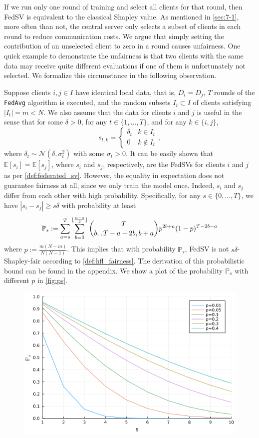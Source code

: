 If we run only one round of training and select all clients for that round, then FedSV is equivalent to the classical Shapley value.  As mentioned in \autoref{sec:7-1}, more often than not, the central server only selects a subset of clients in each round to reduce communication costs. We argue that simply setting the contribution of an unselected client to zero in a round causes unfairness. One quick example to demonstrate the unfairness is that two clients with the same data may receive quite different evaluations if one of them is unfortunately not selected. We formalize this circumstance in the following observation. 

\begin{observation} \label{obs:unfairness_fedsv}
    Suppose clients $i, j \in I$ have identical local data, that is, $D_i = D_j$, $T$ rounds of the \texttt{FedAvg} algorithm is executed, and the random subsets $I_t \subset I$ of clients satisfying $|I_t| = m < N$. We also assume that the data for clients $i$ and $j$ is useful in the sense that for some $\delta > 0$, for any $t \in \{1, \dots, T\}$, and for any $k \in \{i,j\}$,
    \[s_{t, k} = 
        \begin{cases} 
      \delta_t & k \in I_t \\
      0 & k \notin I_t 
   \end{cases},\]
   where $\delta_t \sim \mathcal{N}(\delta, \sigma_t^2)$ with some $\sigma_t > 0$. It can be easily shown that $\mathbb{E}[s_i] = \mathbb{E}[s_j]$, where $s_i$ and $s_j$, respectively, are the FedSVs for clients $i$ and $j$ as per \autoref{def:federated_sv}. However, the equality in expectation does not guarantee fairness at all, since we only train the model once.
Indeed, $s_i$ and $s_j$ differ from each other with high probability. Specifically, for any $s \in \{0, \dots, T\}$, we have $|s_i - s_j| \geq s\delta$ with probability at least
    \[\mathbb{P}_s := \sum_{a = s}^T \sum_{b=0}^{\lfloor\frac{n-a}{2}\rfloor} \binom{T}{b,, T - a - 2b, b+a} p^{2b + a} (1-p)^{T - 2b - a}\]
    where $p := \frac{m(N-m)}{N(N-1)}$. This implies that with probability $\mathbb{P}_s$, FedSV is not $s\delta$-Shapley-fair according to \autoref{def:hfl_fairness}. The derivation of this probabilistic bound can be found in the appendix. We show a plot of the probability $\mathbb{P}_s$ with different $p$ in \autoref{fig:ps}.
    \begin{figure}[t]
        \centering
        \includegraphics[width=.7\textwidth]{./figures/ps.png}

\end{figure}
\end{observation}
